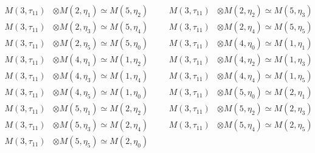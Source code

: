 \begin{align*}
M(3,\tau_{11}) &\otimes M(2,\eta_{1}) \simeq M(5,\eta_{2}) &&& M(3,\tau_{11}) &\otimes M(2,\eta_{2}) \simeq M(5,\eta_{3})\\
M(3,\tau_{11}) &\otimes M(2,\eta_{3}) \simeq M(5,\eta_{4}) &&& M(3,\tau_{11}) &\otimes M(2,\eta_{4}) \simeq M(5,\eta_{5})\\
M(3,\tau_{11}) &\otimes M(2,\eta_{5}) \simeq M(5,\eta_{0}) &&& M(3,\tau_{11}) &\otimes M(4,\eta_{0}) \simeq M(1,\eta_{1})\\
M(3,\tau_{11}) &\otimes M(4,\eta_{1}) \simeq M(1,\eta_{2}) &&& M(3,\tau_{11}) &\otimes M(4,\eta_{2}) \simeq M(1,\eta_{3})\\
M(3,\tau_{11}) &\otimes M(4,\eta_{3}) \simeq M(1,\eta_{4}) &&& M(3,\tau_{11}) &\otimes M(4,\eta_{4}) \simeq M(1,\eta_{5})\\
M(3,\tau_{11}) &\otimes M(4,\eta_{5}) \simeq M(1,\eta_{0}) &&& M(3,\tau_{11}) &\otimes M(5,\eta_{0}) \simeq M(2,\eta_{1})\\
M(3,\tau_{11}) &\otimes M(5,\eta_{1}) \simeq M(2,\eta_{2}) &&& M(3,\tau_{11}) &\otimes M(5,\eta_{2}) \simeq M(2,\eta_{3})\\
M(3,\tau_{11}) &\otimes M(5,\eta_{3}) \simeq M(2,\eta_{4}) &&& M(3,\tau_{11}) &\otimes M(5,\eta_{4}) \simeq M(2,\eta_{5})\\
M(3,\tau_{11}) &\otimes M(5,\eta_{5}) \simeq M(2,\eta_{0})
\end{align*}

